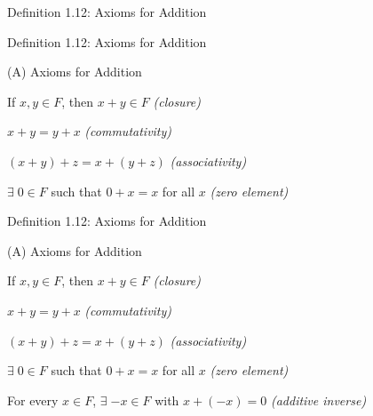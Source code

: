\documentclass[aspectratio=169,12pt,t]{beamer}
\begin{document}
{\begin{frame}{Definition 1.12: Axioms for Addition}
\end{frame}

\begin{frame}{Definition 1.12: Axioms for Addition}
  \begin{defblock}{(A) Axioms for Addition}
    \begin{description}[labelwidth=2.6em, leftmargin=3.2em, font=\bfseries]
      \item[(A1)] If $x, y \in F$, then $x + y \in F$ \hfill\emph{(closure)}
      \item[(A2)] $x + y = y + x$ \hfill\emph{(commutativity)}
      \item[(A3)] $(x + y) + z = x + (y + z)$ \hfill\emph{(associativity)}
      \item[(A4)] $\exists\; 0 \in F$ such that $0 + x = x$ for all $x$ \hfill\emph{(zero element)}
    \end{description}
  \end{defblock}

\end{frame}

\begin{frame}{Definition 1.12: Axioms for Addition}
  \begin{defblock}{(A) Axioms for Addition}
    \begin{description}[labelwidth=2.6em, leftmargin=3.2em, font=\bfseries]
      \item[(A1)] If $x, y \in F$, then $x + y \in F$ \hfill\emph{(closure)}
      \item[(A2)] $x + y = y + x$ \hfill\emph{(commutativity)}
      \item[(A3)] $(x + y) + z = x + (y + z)$ \hfill\emph{(associativity)}
      \item[(A4)] $\exists\; 0 \in F$ such that $0 + x = x$ for all $x$ \hfill\emph{(zero element)}
      \item[(A5)] For every $x \in F$, $\exists\; {-x} \in F$ with $x + (-x) = 0$ \hfill\emph{(additive inverse)}
    \end{description}
  \end{defblock}


\end{frame}}
\end{document}
